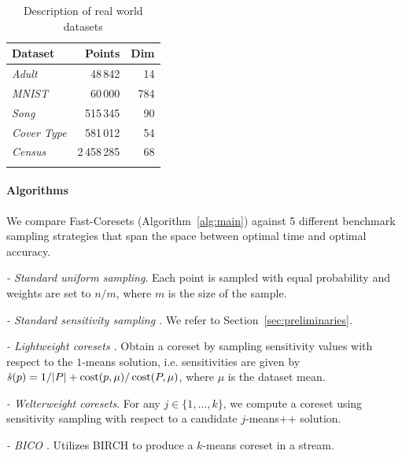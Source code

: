 \begin{table}[htbp]
    \centering
    \begin{tabular}{lrr}
        Dataset & Points & Dim \\
        \hline
        \emph{Adult} & 48\,842 & 14 \\
        \emph{MNIST} & 60\,000 & 784 \\
        \emph{Song} & 515\,345 & 90 \\
        \emph{Cover Type} & 581\,012 & 54 \\
        \emph{Census} & 2\,458\,285 & 68 \\
        \hline
        \vspace*{0.1cm}
    \end{tabular}
    \caption{Description of real world datasets}
    \label{tbl:datasets}
\end{table}


\paragraph*{Algorithms}
\label{ssec:algorithms}


We compare Fast-Coresets (Algorithm~\ref{alg:main}) against 5 different benchmark sampling strategies that span the space between optimal time and optimal
accuracy.
\begin{description}
        \item \emph{- Standard uniform sampling}. Each point is sampled with equal probability and weights are set to $n / m$, where $m$ is the size of the sample.
        \item \emph{- Standard sensitivity sampling \cite{LS10}}. We refer to Section~\ref{sec:preliminaries}.
        \item \emph{- Lightweight coresets \cite{bachem2018scalable}}. Obtain a coreset by sampling sensitivity values with respect to the $1$-means solution,
            i.e. sensitivities are given by $\hat{s}(p) = 1/|P| + \operatorname{cost}(p, \mu) / \operatorname{cost}(P, \mu)$, where $\mu$ is the dataset mean.
        \item \emph{- Welterweight coresets}. For any $j \in \{1,..., k\}$, we compute a coreset using sensitivity sampling with respect to a candidate
            $j$-means++ solution.
        \item \emph{- BICO \cite{bico}}. Utilizes BIRCH \cite{birch} to produce a $k$-means coreset in a stream.
\end{description}



